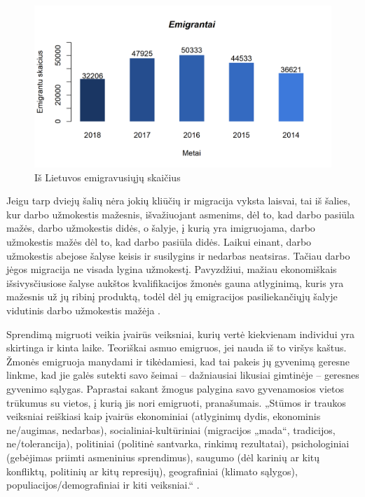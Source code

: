 \documentclass[11pt, titlepage]{article}
\begin{document}
\begin{figure}[H]
\center	
\includegraphics[scale=0.85]{emigrantai}	
\caption{Iš Lietuvos emigravusiųjų skaičius}
\end{figure}
	
	Jeigu tarp dviejų šalių nėra jokių kliūčių ir migracija vyksta laisvai, tai iš šalies, kur darbo užmokestis mažesnis, išvažiuojant asmenims, dėl to, kad darbo pasiūla mažės, darbo užmokestis didės, o šalyje, į kurią yra imigruojama, darbo užmokestis mažės dėl to, kad darbo pasiūla didės. Laikui einant, darbo užmokestis abejose šalyse keisis ir susilygins ir nedarbas neatsiras. Tačiau darbo jėgos migracija ne visada lygina užmokestį. Pavyzdžiui, mažiau ekonomiškais išsivysčiusiose šalyse aukštos kvalifikacijos žmonės gauna atlyginimą, kuris yra mažesnis už jų ribinį produktą, todėl dėl jų emigracijos pasiliekančiųjų šalyje vidutinis darbo užmokestis mažėja \parencite{matiuvsaityte2003darbo}. 
	
	Sprendimą migruoti veikia įvairūs veiksniai, kurių vertė kiekvienam individui yra skirtinga ir kinta laike. Teoriškai asmuo emigruos, jei nauda iš to viršys kaštus. Žmonės emigruoja manydami ir tikėdamiesi, kad tai pakeis jų gyvenimą geresne linkme, kad jie galės sutekti savo šeimai – dažniausiai likusiai gimtinėje – geresnes gyvenimo sąlygas. Paprastai sakant žmogus palygina savo gyvenamosios vietos trūkumus su vietos, į kurią jis nori emigruoti, pranašumais. „Stūmos ir traukos veiksniai reiškiasi kaip įvairūs ekonominiai (atlyginimų dydis, ekonominis ne/augimas, nedarbas), socialiniai-kultūriniai (migracijos „mada“, tradicijos, ne/tolerancija), politiniai (politinė santvarka, rinkimų rezultatai), psichologiniai (gebėjimas priimti asmeninius sprendimus), saugumo (dėl karinių ar kitų konfliktų, politinių ar kitų represijų), geografiniai (klimato sąlygos), populiacijos/demografiniai ir kiti veiksniai.“ \parencite{damuliene2013migracijos}.
\end{document}
